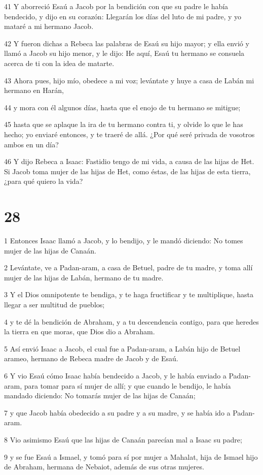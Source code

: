 \par 41 Y aborreció Esaú a Jacob por la bendición con que su padre le había bendecido, y dijo en su corazón: Llegarán los días del luto de mi padre, y yo mataré a mi hermano Jacob.
\par 42 Y fueron dichas a Rebeca las palabras de Esaú su hijo mayor; y ella envió y llamó a Jacob su hijo menor, y le dijo: He aquí, Esaú tu hermano se consuela acerca de ti con la idea de matarte.
\par 43 Ahora pues, hijo mío, obedece a mi voz; levántate y huye a casa de Labán mi hermano en Harán,
\par 44 y mora con él algunos días, hasta que el enojo de tu hermano se mitigue;
\par 45 hasta que se aplaque la ira de tu hermano contra ti, y olvide lo que le has hecho; yo enviaré entonces, y te traeré de allá. ¿Por qué seré privada de vosotros ambos en un día?
\par 46 Y dijo Rebeca a Isaac: Fastidio tengo de mi vida, a causa de las hijas de Het. Si Jacob toma mujer de las hijas de Het, como éstas, de las hijas de esta tierra, ¿para qué quiero la vida?

\chapter{28}

\par 1 Entonces Isaac llamó a Jacob, y lo bendijo, y le mandó diciendo: No tomes mujer de las hijas de Canaán.
\par 2 Levántate, ve a Padan-aram, a casa de Betuel, padre de tu madre, y toma allí mujer de las hijas de Labán, hermano de tu madre.
\par 3 Y el Dios omnipotente te bendiga, y te haga fructificar y te multiplique, hasta llegar a ser multitud de pueblos;
\par 4 y te dé la bendición de Abraham, y a tu descendencia contigo, para que heredes la tierra en que moras, que Dios dio a Abraham.
\par 5 Así envió Isaac a Jacob, el cual fue a Padan-aram, a Labán hijo de Betuel arameo, hermano de Rebeca madre de Jacob y de Esaú.
\par 6 Y vio Esaú cómo Isaac había bendecido a Jacob, y le había enviado a Padan-aram, para tomar para sí mujer de allí; y que cuando le bendijo, le había mandado diciendo: No tomarás mujer de las hijas de Canaán;
\par 7 y que Jacob había obedecido a su padre y a su madre, y se había ido a Padan-aram.
\par 8 Vio asimismo Esaú que las hijas de Canaán parecían mal a Isaac su padre;
\par 9 y se fue Esaú a Ismael, y tomó para sí por mujer a Mahalat, hija de Ismael hijo de Abraham, hermana de Nebaiot, además de sus otras mujeres.

